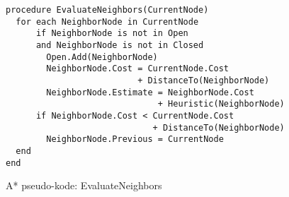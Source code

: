 \begin{figure}[H]
\begin{lstlisting}
procedure EvaluateNeighbors(CurrentNode)
  for each NeighborNode in CurrentNode
      if NeighborNode is not in Open
      and NeighborNode is not in Closed
        Open.Add(NeighborNode)
        NeighborNode.Cost = CurrentNode.Cost 
                          + DistanceTo(NeighborNode)
        NeighborNode.Estimate = NeighborNode.Cost
                              + Heuristic(NeighborNode)
      if NeighborNode.Cost < CurrentNode.Cost
                             + DistanceTo(NeighborNode)
        NeighborNode.Previous = CurrentNode
  end
end
\end{lstlisting}
\caption{A* pseudo-kode: EvaluateNeighbors}\label{AStarCodeEvaluateNeighbors}
\end{figure}